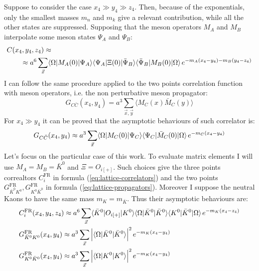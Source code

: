 \documentclass[english, LaM, oneside, noexaminfo]{sapthesis}
\newcommand{\la}{\langle}
\newcommand{\ra}{\rangle}
\begin{document}
Suppose to consider the case $x_4 \gg y_4 \gg z_4$.
Then, because of the exponentials, only the smallest masses $m_n$ and $m_k$ give a relevant contribution, while all the other states are suppressed.
Supposing that the meson operators $M_A$ and $M_B$ interpolate some meson states $\Psi_A$ and $\Psi_B$:
\begin{equation}\label{eq:asymptotic-behav-3pts}
    \begin{split}
        & C(x_4,y_4,z_4)\approx \\
        & \qquad \approx  a^6\sum_{\vec x} \la \Omega | M_A(0) | \Psi_A \ra \la \Psi_A | \Xi (0) | \bar\Psi_B \ra \la \bar\Psi_B | M_B (0) | \Omega \ra \hspace*{.5mm} e^{-m_A(x_4-y_4)-m_B(y_4-z_4)}
    \end{split}
\end{equation}
I can follow the same procedure applied to the two points correlation function with meson operators, i.e. the non perturbative meson propagator:
\begin{equation}\label{eq:2pts-correlator-meson}
    G_{C\bar C}(x_4,y_4) = a^3 \sum_{\vec x, \vec y} \la M_C (x) \bar M_C (y) \ra
\end{equation}
For $x_4 \gg y_4$ it can be proved that the asymptotic behaviours of such correlator is:
\begin{equation}\label{eq:asymptotic-behav-2pts}
    G_{C\bar C}(x_4,y_4) \approx a^3 \sum_{\vec x} \la \Omega | M_C (0) | \Psi_C \ra \la \Psi_C | \bar M_C (0) | \Omega \ra \hspace*{0.5mm} e^{-m_C(x_4-y_4)}
\end{equation}
Let's focus on the particular case of this work.
To evaluate matrix elements I will use $M_A = M_B = \bar K^0$ and $\Xi = O_{i[+]}$.
Such choices give the three points correaltors $C_i^\text{FR}$ in formula (\ref{eq:lattice-correlators}) and the two points $G_{\bar K^0 K^0}^\text{FR}, G_{K^0 \bar  K^0}^\text{FR}$ in formula (\ref{eq:lattice-propagators}).
Moreover I suppose the neutral Kaons to have the same mass $m_K = m_{\bar K}$.
Thus their asymptotic behaviours are:
\begin{equation*}
    \begin{split}
        & C_i^\text{FR}(x_4,y_4,z_4) \approx a^6\sum_{\vec x} \la \bar K^0 | O_{i[+]} | K^0 \ra  \la \Omega | \bar K^0 | \bar K^0 \ra  \la K^0 | \bar K^0 | \Omega \ra  \hspace*{.5mm} e^{-m_K(x_4-z_4)}  \\
        & G_{\bar K^0 K^0}^\text{FR}(x_4,y_4) \approx a^3\sum_{\vec x} \Big| \la \Omega | \bar K^0 | \bar K^0 \ra \Big|^2 \hspace*{.5mm} e^{-m_K(x_4-y_4)} \\
        & G_{K^0\bar K^0}^\text{FR}(x_4,y_4) \approx a^3\sum_{\vec x} \Big| \la \Omega |  K^0 |  K^0 \ra \Big|^2 \hspace*{.5mm} e^{-m_K(x_4-y_4)} \\
    \end{split}
\end{equation*}
\end{document}
